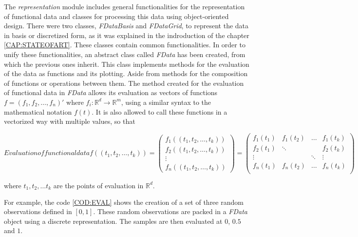 The \textit{representation} module includes general functionalities for the
representation of functional data and classes for processing this data using
object-oriented design.
There were two classes, \textit{FDataBasis}
and \textit{FDataGrid}, to represent the data in basis or discretized form, as it was explained in the indroduction of the chapter \ref{CAP:STATEOFART}.
These classes contain common functionalities.
In order to unify these functionalities, an abstract class called \textit{FData}
has been created, from which the previous ones inherit. This class implements methods for the
evaluation of the data as functions and its plotting.
Aside from methods for the composition of functions or operations between them.
The method created for the evaluation of functional data in \textit{FData}
allows its evaluation
as vectors of functions $f = (f_1, f_2, \dots, f_n)'$ where
$f_i:\mathbb{R}^d\rightarrow\mathbb{R}^m$, using a similar syntax to the mathematical
notation $f(t)$. It is also allowed to call these functions in a vectorized way with multiple values, so that

\begin{equation}[]{Evaluation of functional data}
f((t_1, t_2, \dots, t_k)) =
\begin{pmatrix}
    f_1((t_1, t_2, \dots, t_k))\\
    f_2((t_1, t_2, \dots, t_k))\\
    \vdots\\
    f_n((t_1, t_2, \dots, t_k))
  \end{pmatrix}
=
\begin{pmatrix}
f_1(t_1) & f_1(t_2) & \dots & f_1(t_k) \\
f_2(t_1) & \ddots &  & f_2(t_k) \\
\vdots &  & \ddots & \vdots \\
f_n(t_1) & f_n(t_2) & \dots & f_n(t_k) \\
\end{pmatrix}
\end{equation}

where $t_1, t_2, \dots t_k$ are the points of evaluation in $\mathbb{R}^d$.

For example, the code \ref{COD:EVAL} shows the creation of a set of three random observations
defined in $[0, 1]$. These random observations are packed in a \textit{FData} object
using a discrete representation. The samples are then evaluated at $0$, $0.5$ and $1$.

